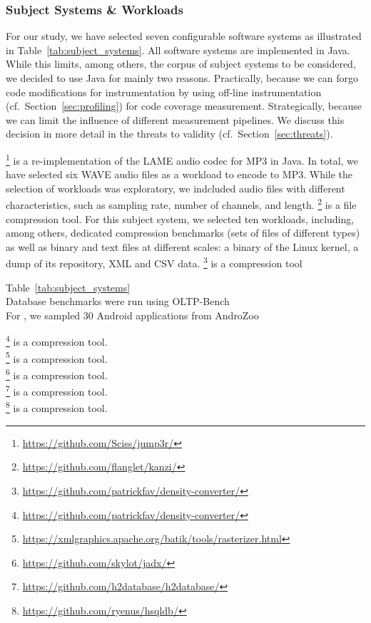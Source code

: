\subsubsection{Subject Systems \& Workloads}
{\color{NavyBlue}
For our study, we have selected {\color{red}seven} configurable software systems as illustrated in Table~\ref{tab:subject_systems}. All software systems are implemented in Java. While this limits, among others, the corpus of subject systems to be considered, we decided to use Java for mainly two reasons. Practically, because we can forgo code modifications for instrumentation by using off-line instrumentation (cf.~Section~\ref{sec:profiling}) for code coverage measurement. Strategically, because we can limit the influence of different measurement pipelines. We discuss this decision in more detail in the threats to validity (cf.~Section~\ref{sec:threats}).

\footnote{\url{https://github.com/Sciss/jump3r/}} is a re-implementation of the LAME audio codec for MP3 in Java. In total, we have selected {\color{red}six} WAVE audio files as a workload to encode to MP3. While the selection of workloads was exploratory, we indcluded audio files with different characteristics, such as sampling rate, number of channels, and length. 
\footnote{\url{https://github.com/flanglet/kanzi/}} is a file compression tool. For this subject system, we selected {\color{red}ten} workloads, including, among others, dedicated compression benchmarks (sets of files of different types) as well as binary and text files at different scales: a binary of the Linux kernel, a dump of its repository, XML and CSV data. 
\footnote{\url{https://github.com/patrickfav/density-converter/}} is a compression tool
}

Table~\ref{tab:subject_systems}\\
Database benchmarks were run using OLTP-Bench\cite{difallah_oltp_2013}\\
For , we sampled 30 Android applications from AndroZoo~\cite{allix_androzoo_2016}
\noindent

\footnote{\url{https://github.com/patrickfav/density-converter/}} is a compression tool.\\
\footnote{\url{https://xmlgraphics.apache.org/batik/tools/rasterizer.html}} is a compression tool.\\
\footnote{\url{https://github.com/skylot/jadx/}} is a compression tool.\\
\footnote{\url{https://github.com/h2database/h2database/}} is a compression tool.\\
\footnote{\url{https://github.com/ryenus/hsqldb/}} is a compression tool.\\

